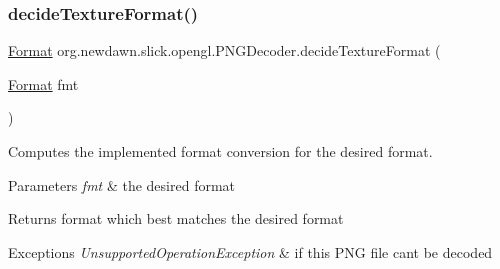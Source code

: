 \subsubsection{\texorpdfstring{decide\+Texture\+Format()}{decideTextureFormat()}}
{\footnotesize\ttfamily \mbox{\hyperlink{classorg_1_1newdawn_1_1slick_1_1opengl_1_1_p_n_g_decoder_1_1_format}{Format}} org.\+newdawn.\+slick.\+opengl.\+P\+N\+G\+Decoder.\+decide\+Texture\+Format (\begin{DoxyParamCaption}\item[{\mbox{\hyperlink{classorg_1_1newdawn_1_1slick_1_1opengl_1_1_p_n_g_decoder_1_1_format}{Format}}}]{fmt }\end{DoxyParamCaption})\hspace{0.3cm}{\ttfamily [inline]}}

Computes the implemented format conversion for the desired format.


\begin{DoxyParams}{Parameters}
{\em fmt} & the desired format \\
\hline
\end{DoxyParams}
\begin{DoxyReturn}{Returns}
format which best matches the desired format 
\end{DoxyReturn}

\begin{DoxyExceptions}{Exceptions}
{\em Unsupported\+Operation\+Exception} & if this P\+NG file can\textquotesingle{}t be decoded \\
\hline
\end{DoxyExceptions}

